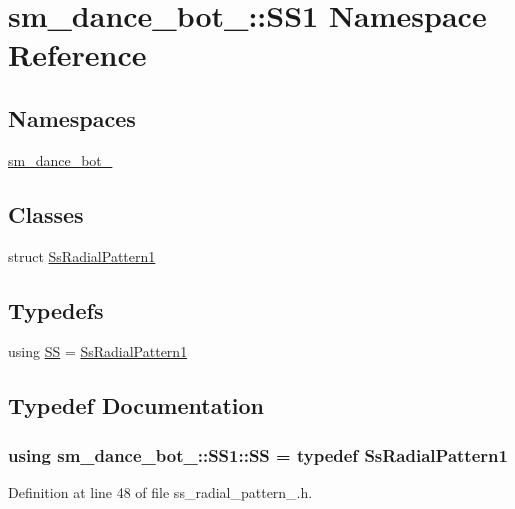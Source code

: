 \hypertarget{namespacesm__dance__bot__2_1_1SS1}{}\section{sm\+\_\+dance\+\_\+bot\+\_\+:\+:S\+S1 Namespace Reference}
\label{namespacesm__dance__bot__2_1_1SS1}
\subsection*{Namespaces}
\begin{DoxyCompactItemize}
\item 
 \hyperlink{namespacesm__dance__bot__2_1_1SS1_1_1sm__dance__bot__2}{sm\+\_\+dance\+\_\+bot\+\_}
\end{DoxyCompactItemize}
\subsection*{Classes}
\begin{DoxyCompactItemize}
\item 
struct \hyperlink{structsm__dance__bot__2_1_1SS1_1_1SsRadialPattern1}{Ss\+Radial\+Pattern1}
\end{DoxyCompactItemize}
\subsection*{Typedefs}
\begin{DoxyCompactItemize}
\item 
using \hyperlink{namespacesm__dance__bot__2_1_1SS1_a01643449f4dda719d7f3a47d09453ed0}{SS} = \hyperlink{structsm__dance__bot__2_1_1SS1_1_1SsRadialPattern1}{Ss\+Radial\+Pattern1}
\end{DoxyCompactItemize}


\subsection{Typedef Documentation}
\subsubsection[{\texorpdfstring{SS}{SS}}]{\setlength{\rightskip}{0pt plus 5cm}using {\bf sm\+\_\+dance\+\_\+bot\+\_\+::\+S\+S1\+::\+SS} = typedef {\bf Ss\+Radial\+Pattern1}}\hypertarget{namespacesm__dance__bot__2_1_1SS1_a01643449f4dda719d7f3a47d09453ed0}{}\label{namespacesm__dance__bot__2_1_1SS1_a01643449f4dda719d7f3a47d09453ed0}


Definition at line 48 of file ss\+\_\+radial\+\_\+pattern\+\_.\+h.

